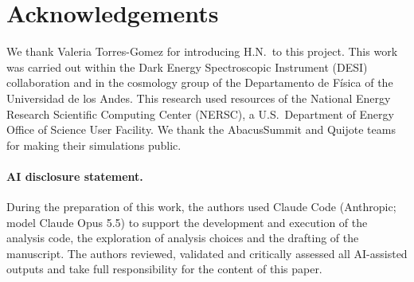 \section*{Acknowledgements}

We thank Valeria Torres-Gomez for introducing H.N.\ to this project. This work was carried out within the Dark Energy Spectroscopic Instrument (DESI) collaboration and in the cosmology group of the Departamento de F\'isica of the Universidad de los Andes. This research used resources of the National Energy Research Scientific Computing Center (NERSC), a U.S.\ Department of Energy Office of Science User Facility. We thank the AbacusSummit and Quijote teams for making their simulations public.

\paragraph{AI disclosure statement.} During the preparation of this work, the authors used Claude Code (Anthropic; model Claude Opus 5.5) to support the development and execution of the analysis code, the exploration of analysis choices and the drafting of the manuscript. The authors reviewed, validated and critically assessed all AI-assisted outputs and take full responsibility for the content of this paper.
